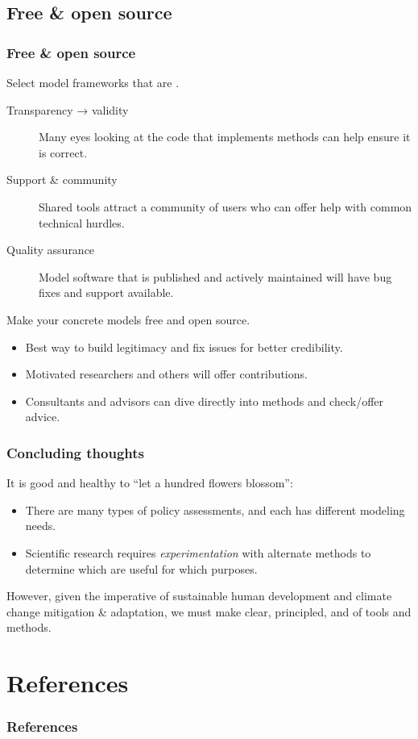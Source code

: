 \documentclass[12pt,aspectratio=169]{beamer}
\begin{document}
\subsection{Free \& open source}
\begin{frame}
\frametitle{Free \& open source}

Select model frameworks that are .

\begin{description}
  \item [Transparency → validity] Many eyes looking at the code that implements methods can help ensure it is correct.
  \item [Support \& community] Shared tools attract a community of users who can offer help with common technical hurdles.
  \item [Quality assurance] Model software that is published and actively maintained will have bug fixes and support available.
\end{description}

\bigskip
Make your concrete models free and open source.
\begin{itemize}
  \item Best way to build legitimacy and fix issues for better credibility.
  \item Motivated researchers and others will offer contributions.
  \item Consultants and advisors can dive directly into methods and check/offer advice.
\end{itemize}

\end{frame}

\begin{frame}
\frametitle{Concluding thoughts}

It is good and healthy to “let a hundred flowers blossom”:
\begin{itemize}
  \item There are many types of policy assessments, and each has different modeling needs.
  \item Scientific research requires \emph{experimentation} with alternate methods to determine which are useful for which purposes.
\end{itemize}

\bigskip
However, given the imperative of sustainable human development and climate change mitigation \& adaptation, we must make clear, principled, and  of tools and methods.
\end{frame}

\begin{frame}[plain]
  \centering \Huge {}
\end{frame}

\appendix

\section{References}

\begin{frame}
\frametitle{References}

\printbibliography[heading=none]

\end{frame}
\end{document}
